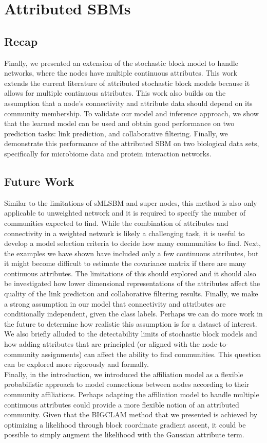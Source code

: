 \section{Attributed SBMs}
\subsection{Recap}
Finally, we presented an extension of the stochastic block model to handle networks, where the nodes have multiple continuous attributes. This work extends the current literature of attributed stochastic block models because it allows for multiple continuous attributes. This work also builds on the assumption that a node's connectivity and attribute data should depend on its community membership. To validate our model and inference approach, we show that the learned model can be used and obtain good performance on two prediction tasks: link prediction, and collaborative filtering. Finally, we demonstrate this performance of the attributed SBM on two biological data sets, specifically for microbiome data and protein interaction networks. 
\subsection{Future Work}
Similar to the limitations of sMLSBM and super nodes, this method is also only applicable to unweighted network and it is required to specify the number of communities expected to find. While the combination of attributes and connectivity in a weighted network is likely a challenging task, it is useful to develop a model selection criteria to decide how many communities to find. Next, the examples we have shown have included only a few continuous attributes, but it might become difficult to estimate the covariance matrix if there are many continuous attributes. The limitations of this should explored and it should also be investigated how lower dimensional representations of the attributes affect the quality of the link prediction and collaborative filtering results. Finally, we make a strong assumption in our model that connectivity and attributes are conditionally independent, given the class labels. Perhaps we can do more work in the future to determine how realistic this assumption is for a dataset of interest. \\
\indent We also briefly alluded to the detectability limits of stochastic block models and how adding attributes that are principled (or aligned with the node-to-community assignments) can affect the ability to find communities. This question can be explored more rigorously and formally. \\
\indent Finally, in the introduction, we introduced the affiliation model as a flexible probabilistic approach to model connections between nodes according to their community affiliations. Perhaps adapting the affiliation model to handle multiple continuous attributes could provide a more flexible notion of an attributed community. Given that the BIGCLAM method that we presented is achieved by optimizing a likelihood through block coordinate gradient ascent, it could be possible to simply augment the likelihood with the Gaussian attribute term. \\





